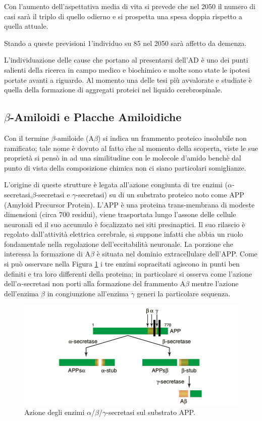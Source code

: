 \documentclass[a4paper, 12pt]{article}
\begin{document}
Con l'aumento dell'aspettativa media di vita si prevede che nel 2050 il numero di casi sarà il triplo di quello odierno e si prospetta una spesa doppia rispetto a quella attuale.\cite{noauthor_world_2018}

Stando a queste previsioni 1'individuo su 85 nel 2050 sarà affetto da demenza.

L'individuazione delle cause che portano al presentarsi dell'AD è uno dei punti salienti della ricerca in campo medico e biochimico e molte sono state le ipotesi portate avanti a riguardo. Al momento una delle tesi più avvalorate e studiate è quella della formazione di aggregati proteici nel liquido cerebrospinale.

\subsection{$\beta$-Amiloidi e Placche Amiloidiche}
\label{sec:ab}
Con il termine $\beta$-amiloide (A$\beta$) si indica un frammento proteico insolubile non ramificato; tale nome è dovuto al fatto che al momento della scoperta, viste le sue proprietà si pensò in ad una similitudine con le molecole d'amido benchè dal punto di vista della composizione chimica non ci siano particolari somiglianze.\cite{lennarz_encyclopedia_2004}

L'origine di queste strutture è legata all'azione congiunta di tre enzimi ($\alpha$-secretasi,$\beta$-secretasi e $\gamma$-secretasi) su di un substrato proteico noto come APP (Amyloid Precursor Protein). L'APP è una proteina trans-membrana di modeste dimensioni (circa 700 residui), viene trasportata lungo l'assone delle cellule neuronali ed il suo accumulo è focalizzato nei siti presinaptici. Il suo rilascio è regolato dall'attività elettrica cerebrale, si suppone infatti che abbia un ruolo fondamentale nella regolazione dell'eccitabilità neuronale.\cite{mattson_cellular_1997}
La porzione che interessa la formazione di A$\beta$ è situata nel dominio extracellulare dell'APP. Come si può osservare nella Figura \ref{fig:app} i tre enzimi sopracitati agiscono in punti ben definiti e tra loro differenti della proteina; in particolare si osserva come l'azione dell'$\alpha$-secretasi non porti alla formazione del frammento A$\beta$  mentre l'azione dell'enzima $\beta$ in congiunzione all'enzima $\gamma$ generi la particolare sequenza.\cite{goedert_century_2006}

\begin{figure}[H]
	\includegraphics[width=\linewidth]{immagini/APP.png}
	\caption{Azione degli enzimi $\alpha$/$\beta$/$\gamma$-secretasi sul substrato APP.}
	\label{fig:app}
\end{figure}
\end{document}
